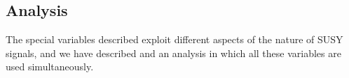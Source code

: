 \subsection{Analysis}
The special variables described exploit different aspects of the nature of SUSY signals, and we have described and an analysis in which all these variables are used simultaneously. 